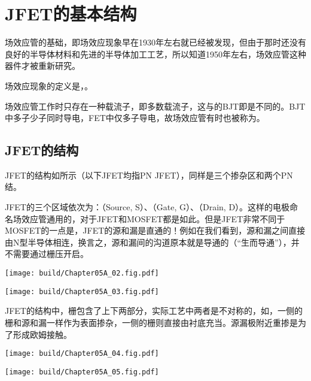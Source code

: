 \section{JFET的基本结构}
场效应管的基础，即场效应现象早在1930年左右就已经被发现，但由于那时还没有良好的半导体材料和先进的半导体加工工艺，所以知道1950年左右，场效应管这种器件才被重新研究。

场效应现象的定义是，。

场效应管工作时只存在一种载流子，即多数载流子，这与的BJT即是不同的。BJT中多子少子同时导电，FET中仅多子导电，故场效应管有时也被称为。

\subsection{JFET的结构}
JFET的结构如所示（以下JFET均指PN JFET），同样是三个掺杂区和两个PN结。

JFET的三个区域依次为：（Source, S）、（Gate, G）、（Drain, D）。这样的电极命名场效应管通用的，对于JFET和MOSFET都是如此。但是JFET非常不同于MOSFET的一点是，JFET的源和漏是直通的！例如在我们看到，源和漏之间直接由N型半导体相连，换言之，源和漏间的沟道原本就是导通的（“生而导通”），并不需要通过栅压开启。

\begin{Figure}[JFET的结构简图]
    \begin{FigureSub}[N沟道JFET的结构简图]
        \texttt{[image: build/Chapter05A\_02.fig.pdf]}
    \end{FigureSub}
    \hspace{0.2cm}
    \begin{FigureSub}[P沟道JFET的结构简图]
        \texttt{[image: build/Chapter05A\_03.fig.pdf]}
    \end{FigureSub}
\end{Figure}

JFET的结构中，栅包含了上下两部分，实际工艺中两者是不对称的，如，一侧的栅和源和漏一样作为表面掺杂，一侧的栅则直接由衬底充当。源漏极附近重掺是为了形成欧姆接触。
\begin{Figure}[JFET的实际结构]
    \begin{FigureSub}[N沟道JFET的实际结构]
        \texttt{[image: build/Chapter05A\_04.fig.pdf]}
    \end{FigureSub}
    \hspace{0.2cm}
    \begin{FigureSub}[P沟道JFET的实际结构]
        \texttt{[image: build/Chapter05A\_05.fig.pdf]}
    \end{FigureSub}
\end{Figure}

